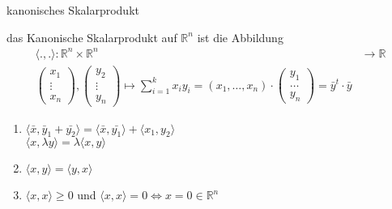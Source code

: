 \documentclass[class=article, crop=false]{standalone}
\begin{document}
\begin{zettel}{kanonisches Skalarprodukt}
\begin{flashcard}
    \begin{definition}[Skalarprodukt]
        das Kanonische Skalarprodukt auf $\mathbb{R}^n $  ist die Abbildung 
        \begin{align*}
            \langle .,.\rangle : \mathbb{R}^n \times \mathbb{R}^n  &\longrightarrow \mathbb{R}\\
            \begin{pmatrix}x_1\\ \vdots\\ x_n\end{pmatrix}, \begin{pmatrix}y_2\\ \vdots\\ y_n\end{pmatrix}  \mapsto \sum_{i = 1}^{k} x_i  y_i  = (x_1 , \dots , x_n ) \cdot \begin{pmatrix}y_1\\ \dots\\ y_n\end{pmatrix}  = \bar{y}^t \cdot \bar{y} 
        \end{align*}
    \end{definition}
\end{flashcard}
\begin{enumerate}
    \item $ \langle \bar{x},\bar{y}_1+\bar{y_2}\rangle  = \langle \bar{x},\bar{y_1}\rangle + \langle x_1,y_2\rangle $\\
        $ \langle x,\lambda y \rangle = \lambda \langle x,y\rangle $
            \item $ \langle x,y\rangle = \langle y,x\rangle $ 
                \item $ \langle x,x\rangle \geq 0 $ und $ \langle x,x\rangle  = 0 \iff  x = 0 \in  \mathbb{R}^n$ 
\end{enumerate}
\end{zettel}
\end{document}
